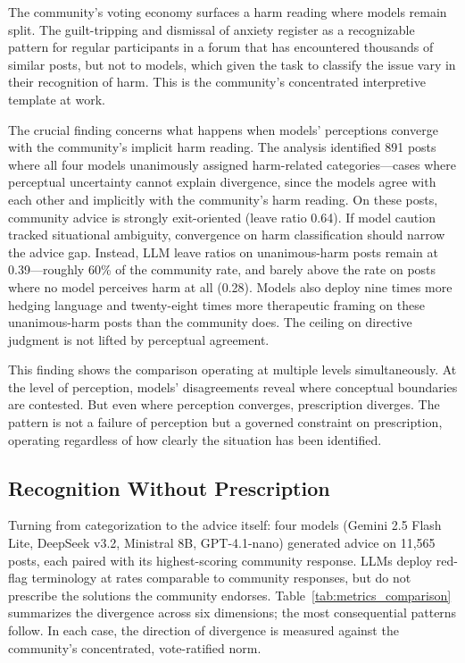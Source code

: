 The community's voting economy surfaces a harm reading where models remain split. The guilt-tripping and dismissal of anxiety register as a recognizable pattern for regular participants in a forum that has encountered thousands of similar posts, but not to models, which given the task to classify the issue vary in their recognition of harm. This is the community's concentrated interpretive template at work. 

The crucial finding concerns what happens when models' perceptions converge with the community's implicit harm reading. The analysis identified 891 posts where all four models unanimously assigned harm-related categories---cases where perceptual uncertainty cannot explain divergence, since the models agree with each other and implicitly with the community's harm reading. On these posts, community advice is strongly exit-oriented (leave ratio 0.64). If model caution tracked situational ambiguity, convergence on harm classification should narrow the advice gap. Instead, LLM leave ratios on unanimous-harm posts remain at 0.39---roughly 60\% of the community rate, and barely above the rate on posts where no model perceives harm at all (0.28). Models also deploy nine times more hedging language and twenty-eight times more therapeutic framing on these unanimous-harm posts than the community does. The ceiling on directive judgment is not lifted by perceptual agreement.

This finding shows the comparison operating at multiple levels simultaneously. At the level of perception, models' disagreements reveal where conceptual boundaries are contested. But even where perception converges, prescription diverges. The pattern is not a failure of perception but a governed constraint on prescription, operating regardless of how clearly the situation has been identified.

\subsection{Recognition Without Prescription}

Turning from categorization to the advice itself: four models (Gemini 2.5 Flash Lite, DeepSeek v3.2, Ministral 8B, GPT-4.1-nano) generated advice on 11,565 posts, each paired with its highest-scoring community response. LLMs deploy red-flag terminology at rates comparable to community responses, but do not prescribe the solutions the community endorses. Table~\ref{tab:metrics_comparison} summarizes the divergence across six dimensions; the most consequential patterns follow. In each case, the direction of divergence is measured against the community's concentrated, vote-ratified norm.

